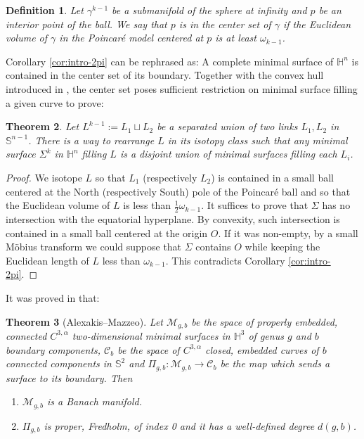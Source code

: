 \documentclass[11pt]{article}
\newtheorem{theorem}{Theorem}
\newtheorem{definition}[theorem]{Definition}
\begin{document}
\begin{definition}
Let  \(\gamma^{k-1}\) be a submanifold of the sphere at infinity and \(p\) be an interior
point of the ball. We say that \(p\) is in the \emph{center
set} of \(\gamma\) if the Euclidean volume of \(\gamma\) in the Poincaré model centered at \(p\) is at least \(\omega_{k-1}\).
\end{definition}

Corollary \ref{cor:intro-2pi} can be rephrased as: A complete minimal surface of \(\mathbb{H}^n\) is
contained in the center set of its boundary. 
Together with the convex hull introduced in
\cite{Anderson82_CompleteMinimalVarieties}, 
the center set poses sufficient restriction on minimal surface filling a given curve to prove:

\begin{theorem}
\label{thm:separation}
Let \(L^{k-1}:=  L_1 \sqcup L_2\) be a separated union of two links \(L_1,
L_2\) in \(\mathbb{S}^{n-1}\). There is a way to rearrange \(L\) in its isotopy class such
that any minimal surface \(\Sigma^k\) in \(\mathbb{H}^n\) filling \(L\) is a disjoint union of minimal surfaces filling
each \(L_i\).
\end{theorem}
\begin{proof}
We isotope \(L\) so that \(L_1\) (respectively \(L_2\)) is contained in a small ball centered at the
North (respectively South) pole of the Poincaré ball and so that the Euclidean volume of \(L\) is less than \(\frac{1}{2}\omega_{k-1}\). 
It suffices to prove that \(\Sigma\) has no intersection with the equatorial hyperplane. By convexity, such
intersection is contained in a small ball centered at the origin \(O\). If it was
non-empty, by a small Möbius transform we could suppose that \(\Sigma\) contains \(O\) while keeping the Euclidean length of \(L\) less than \(\omega_{k-1}\). 
This contradicts Corollary \ref{cor:intro-2pi}.
\end{proof}

It was proved in \cite{Alexakis.Mazzeo10_RenormalizedAreaProperly} that:

\begin{theorem}[Alexakis--Mazzeo]
\label{thm:AM}
Let  \(\mathcal{M}_{g, b}\) be the space of properly embedded, connected \(C^{3,\alpha}\)
   two-dimensional minimal surfaces in \(\mathbb{H}^3\) of genus \(g\) and \(b\) boundary components, \(\mathcal{C}_b\)
   be the space of \(C^{3,\alpha}\) closed, embedded curves of \(b\)
   connected components in \(\mathbb{S}^2\) and  \(\Pi_{g,b}:\mathcal{M}_{g,b} \longrightarrow
   \mathcal{C}_b\) be the map which sends a surface to its boundary. Then
\begin{enumerate}
\item \(\mathcal{M}_{g, b}\) is a Banach manifold.
\item \(\Pi_{g,b}\) is proper, Fredholm, of index 0 and it has a well-defined degree \(d(g,b)\).
\end{enumerate}
\end{theorem}
\end{document}
